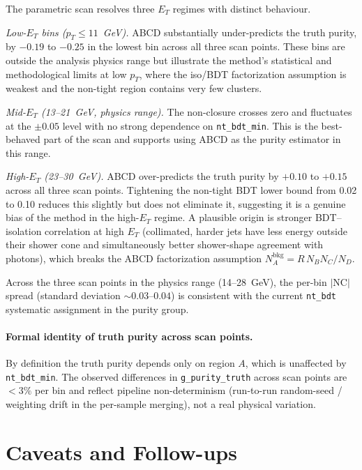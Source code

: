 \documentclass[11pt]{article}
\begin{document}
The parametric scan resolves three $E_T$ regimes with distinct behaviour.

\emph{Low-$E_T$ bins ($p_T \le 11$~GeV).} ABCD substantially under-predicts the truth purity, by $-0.19$ to $-0.25$ in the lowest bin across all three scan points. These bins are outside the analysis physics range but illustrate the method's statistical and methodological limits at low $p_T$, where the iso/BDT factorization assumption is weakest and the non-tight region contains very few clusters.

\emph{Mid-$E_T$ (13--21~GeV, physics range).} The non-closure crosses zero and fluctuates at the $\pm 0.05$ level with no strong dependence on \texttt{nt\_bdt\_min}. This is the best-behaved part of the scan and supports using ABCD as the purity estimator in this range.

\emph{High-$E_T$ (23--30~GeV).} ABCD over-predicts the truth purity by $+0.10$ to $+0.15$ across all three scan points. Tightening the non-tight BDT lower bound from 0.02 to 0.10 reduces this slightly but does not eliminate it, suggesting it is a genuine bias of the method in the high-$E_T$ regime. A plausible origin is stronger BDT--isolation correlation at high $E_T$ (collimated, harder jets have less energy outside their shower cone and simultaneously better shower-shape agreement with photons), which breaks the ABCD factorization assumption $N^{\mathrm{bkg}}_A = R\,N_B N_C / N_D$.

Across the three scan points in the physics range (14--28~GeV), the per-bin $|\mathrm{NC}|$ spread (standard deviation $\sim 0.03$--$0.04$) is consistent with the current \texttt{nt\_bdt} systematic assignment in the purity group.

\paragraph{Formal identity of truth purity across scan points.}
By definition the truth purity depends only on region $A$, which is unaffected by \texttt{nt\_bdt\_min}. The observed differences in \texttt{g\_purity\_truth} across scan points are $<3\%$ per bin and reflect pipeline non-determinism (run-to-run random-seed / weighting drift in the per-sample merging), not a real physical variation.

\section{Caveats and Follow-ups}
\end{document}
